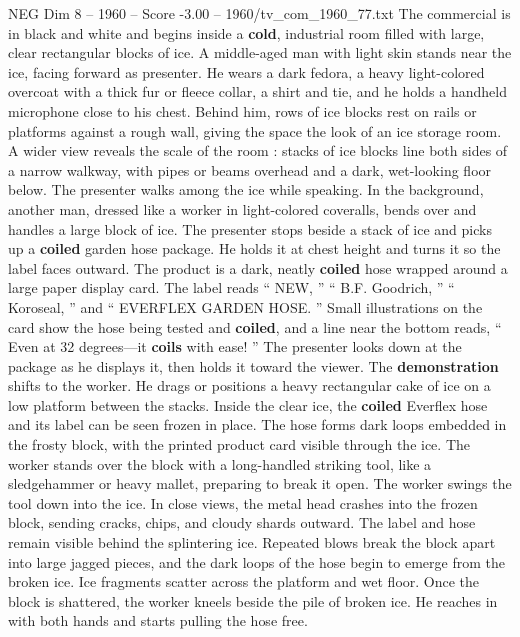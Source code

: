 \begin{textsample}{NEG Dim 8 – 1960 – Score -3.00 – 1960/tv\_com\_1960\_77.txt}  \label{ex:f8_neg_005}
The commercial is in black and white and begins inside a \textbf{cold}, industrial room filled with large, clear rectangular blocks of ice.
A middle-aged man with light skin stands near the ice, facing forward as presenter.
He wears a dark fedora, a heavy light-colored overcoat with a thick fur or fleece collar, a shirt and tie, and he holds a handheld microphone close to his chest.
Behind him, rows of ice blocks rest on rails or platforms against a rough wall, giving the space the look of an ice storage room.
A wider view reveals the scale of the room : stacks of ice blocks line both sides of a narrow walkway, with pipes or beams overhead and a dark, wet-looking floor below.
The presenter walks among the ice while speaking.
In the background, another man, dressed like a worker in light-colored coveralls, bends over and handles a large block of ice.
The presenter stops beside a stack of ice and picks up a \textbf{coiled} garden hose package.
He holds it at chest height and turns it so the label faces outward.
The product is a dark, neatly \textbf{coiled} hose wrapped around a large paper display card.
The label reads “ NEW, ” “ B.F.
Goodrich, ” “ Koroseal, ” and “ EVERFLEX GARDEN HOSE. ” Small illustrations on the card show the hose being tested and \textbf{coiled}, and a line near the bottom reads, “ Even at 32 degrees—it \textbf{coils} with ease! ” The presenter looks down at the package as he displays it, then holds it toward the viewer.
The \textbf{demonstration} shifts to the worker.
He drags or positions a heavy rectangular cake of ice on a low platform between the stacks.
Inside the clear ice, the \textbf{coiled} Everflex hose and its label can be seen frozen in place.
The hose forms dark loops embedded in the frosty block, with the printed product card visible through the ice.
The worker stands over the block with a long-handled striking tool, like a sledgehammer or heavy mallet, preparing to break it open.
The worker swings the tool down into the ice.
In close views, the metal head crashes into the frozen block, sending cracks, chips, and cloudy shards outward.
The label and hose remain visible behind the splintering ice.
Repeated blows break the block apart into large jagged pieces, and the dark loops of the hose begin to emerge from the broken ice.
Ice fragments scatter across the platform and wet floor.
Once the block is shattered, the worker kneels beside the pile of broken ice.
He reaches in with both hands and starts pulling the hose free.

\end{textsample}
